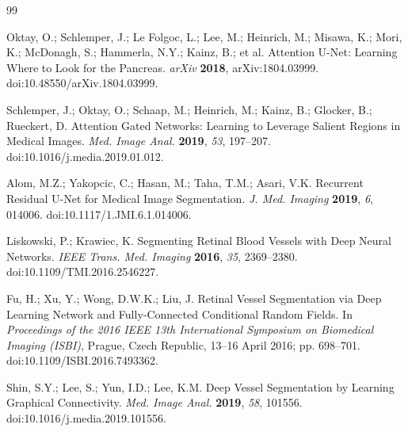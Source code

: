 \documentclass[jimaging,article,submit,pdftex,moreauthors]{Definitions/mdpi}%
\providecommand{\href}[2]{#2}
\begin{document}
\begin{thebibliography}{99}

Oktay, O.; Schlemper, J.; Le Folgoc, L.; Lee, M.; Heinrich, M.; Misawa, K.; Mori, K.; McDonagh, S.; Hammerla, N.Y.; Kainz, B.; et al. Attention U-Net: Learning Where to Look for the Pancreas. \textit{arXiv} \textbf{2018}, arXiv:1804.03999. \href{https://doi.org/10.48550/arXiv.1804.03999}{doi:10.48550/arXiv.1804.03999}.




Schlemper, J.; Oktay, O.; Schaap, M.; Heinrich, M.; Kainz, B.; Glocker, B.; Rueckert, D. Attention Gated Networks: Learning to Leverage Salient Regions in Medical Images. \textit{Med. Image Anal.} \textbf{2019}, \textit{53}, 197--207. \href{https://doi.org/10.1016/j.media.2019.01.012}{doi:10.1016/j.media.2019.01.012}.




Alom, M.Z.; Yakopcic, C.; Hasan, M.; Taha, T.M.; Asari, V.K. Recurrent Residual U-Net for Medical Image Segmentation. \textit{J. Med. Imaging} \textbf{2019}, \textit{6}, 014006. \href{https://doi.org/10.1117/1.JMI.6.1.014006}{doi:10.1117/1.JMI.6.1.014006}.




Liskowski, P.; Krawiec, K. Segmenting Retinal Blood Vessels with Deep Neural Networks. \textit{IEEE Trans. Med. Imaging} \textbf{2016}, \textit{35}, 2369--2380. \href{https://doi.org/10.1109/TMI.2016.2546227}{doi:10.1109/TMI.2016.2546227}.




Fu, H.; Xu, Y.; Wong, D.W.K.; Liu, J. Retinal Vessel Segmentation via Deep Learning Network and Fully-Connected Conditional Random Fields. In \textit{Proceedings of the 2016 IEEE 13th International Symposium on Biomedical Imaging (ISBI)}, Prague, Czech Republic, 13--16 April 2016; pp. 698--701. \href{https://doi.org/10.1109/ISBI.2016.7493362}{doi:10.1109/ISBI.2016.7493362}.




Shin, S.Y.; Lee, S.; Yun, I.D.; Lee, K.M. Deep Vessel Segmentation by Learning Graphical Connectivity. \textit{Med. Image Anal.} \textbf{2019}, \textit{58}, 101556. \href{https://doi.org/10.1016/j.media.2019.101556}{doi:10.1016/j.media.2019.101556}.




\end{thebibliography}
\end{document}
